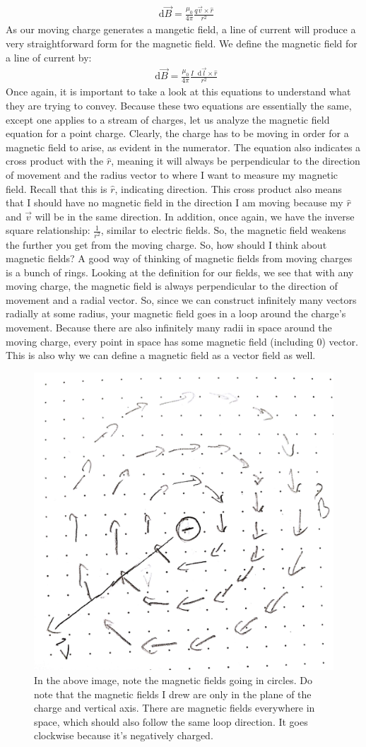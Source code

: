 \documentclass{article}
\newcommand*\dif{\mathop{}\!\mathrm{d}}
\begin{document}
\begin{align*}
\dif \vec{B} = \frac{\mu_0}{4\pi}\frac{q\vec{v}\times\hat{r}}{r^2}
\end{align*}
As our moving charge generates a mangetic field, a line of current will produce a very straightforward form for the magnetic field. We define the magnetic field for a line of current by: 
\begin{align*}
\dif \vec{B} = \frac{\mu_0}{4\pi}\frac{I\dif\vec{l}\times\hat{r}}{r^2}
\end{align*}
Once again, it is important to take a look at this equations to understand what they are trying to convey. Because these two equations are essentially the same, except one applies to a stream of charges, let us analyze the magnetic field equation for a point charge. Clearly, the charge has to be moving in order for a magnetic field to arise, as evident in the numerator. The equation also indicates a cross product with the $\hat{r}$, meaning it will always be perpendicular to the direction of movement and the radius vector to where I want to measure my magnetic field. Recall that this is $\hat{r}$, indicating direction. This cross product also means that I should have no magnetic field in the direction I am moving because my $\hat{r}$ and $\vec{v}$ will be in the same direction. In addition, once again, we have the inverse square relationship: $\frac{1}{r^2}$, similar to electric fields. So, the magnetic field weakens the further you get from the moving charge. So, how should I think about magnetic fields? A good way of thinking of magnetic fields from moving charges is a bunch of rings. Looking at the definition for our fields, we see that with any moving charge, the magnetic field is always perpendicular to the direction of movement and a radial vector. So, since we can construct infinitely many vectors radially at some radius, your magnetic field goes in a loop around the charge's movement. Because there are also infinitely many radii in space around the moving charge, every point in space has some magnetic field (including $0$) vector. This is also why we can define a magnetic field as a vector field as well. 

\pagebreak
\begin{figure}[ht]
\center
\includegraphics[width=.3\textwidth]{images/Week3pic1.jpg}
\caption{In the above image, note the magnetic fields going in circles. Do note that the magnetic fields I drew are only in the plane of the charge and vertical axis. There are magnetic fields everywhere in space, which should also follow the same loop direction. It goes clockwise because it's negatively charged.}
\end{figure}
\end{document}
